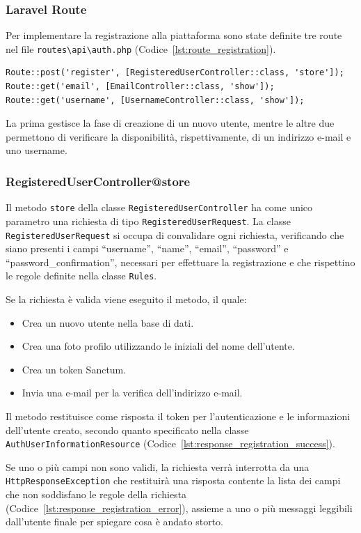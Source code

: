 \subsubsection{Laravel Route}
Per implementare la registrazione alla piattaforma sono state definite tre route nel file \verb|routes\api\auth.php| (Codice~\ref{lst:route_registration}).
\begin{lstlisting}[caption={Route per la registrazione}, label={lst:route_registration}]
Route::post('register', [RegisteredUserController::class, 'store']);
Route::get('email', [EmailController::class, 'show']);
Route::get('username', [UsernameController::class, 'show']);
\end{lstlisting}

La prima gestisce la fase di creazione di un nuovo utente, mentre le altre due permettono di verificare la disponibilit\`a, rispettivamente, di un indirizzo e-mail e uno username.

\subsubsection{RegisteredUserController@store}
Il metodo \verb|store| della classe \verb|RegisteredUserController| ha come unico parametro una richiesta di tipo \verb|RegisteredUserRequest|. La classe \verb|RegisteredUserRequest| si occupa di convalidare ogni richiesta, verificando che siano presenti i campi ``username'', ``name'', ``email'', ``password'' e ``password\_confirmation'', necessari per effettuare la registrazione e che rispettino le regole definite nella classe \verb|Rules|.

Se la richiesta \`e valida viene eseguito il metodo, il quale:
\begin{itemize}
	\item Crea un nuovo utente nella base di dati.
	\item Crea una foto profilo utilizzando le iniziali del nome dell'utente.
	\item Crea un token Sanctum.
	\item Invia una e-mail per la verifica dell'indirizzo e-mail.
\end{itemize} 

Il metodo restituisce come risposta il token per l'autenticazione e le informazioni dell'utente creato, secondo quanto specificato nella classe \verb|AuthUserInformationResource| (Codice~\ref{lst:response_registration_success}).

Se uno o pi\`u campi non sono validi, la richiesta verr\`a interrotta da una \verb|HttpResponseException| che restituir\`a una risposta contente la lista dei campi che non soddisfano le regole della richiesta (Codice~\ref{lst:response_registration_error}), assieme a uno o pi\`u messaggi leggibili dall'utente finale per spiegare cosa \`e andato storto.

